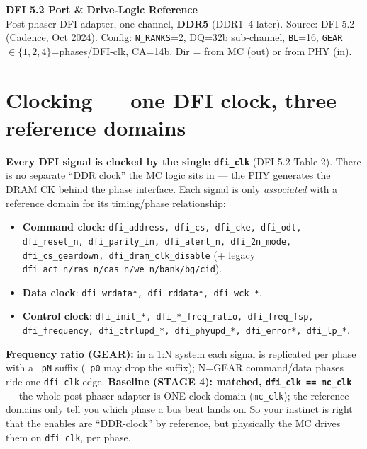 \documentclass[9pt]{extarticle}
\begin{document}
\begin{center}
{\LARGE\textbf{DFI 5.2 Port \& Drive-Logic Reference}}\\[2pt]
{\small Post-phaser DFI adapter, one channel, \textbf{DDR5} (DDR1--4 later). Source: DFI 5.2
(Cadence, Oct 2024). Config: \texttt{N\_RANKS}=2, DQ=32b sub-channel, \texttt{BL}=16,
\texttt{GEAR}$\in\{1,2,4\}$=phases/DFI-clk, CA=14b. Dir = from MC (out) or from PHY (in).}
\end{center}

\section{Clocking --- one DFI clock, three reference domains}
\textbf{Every DFI signal is clocked by the single \texttt{dfi\_clk}} (DFI 5.2 Table 2). There is no
separate ``DDR clock'' the MC logic sits in --- the PHY generates the DRAM CK behind the phase
interface. Each signal is only \emph{associated} with a reference domain for its timing/phase
relationship:
\begin{itemize}\itemsep1pt
\item \textcolor{cmd}{\textbf{Command clock}}: \texttt{dfi\_address, dfi\_cs, dfi\_cke, dfi\_odt,
  dfi\_reset\_n, dfi\_parity\_in, dfi\_alert\_n, dfi\_2n\_mode, dfi\_cs\_geardown,
  dfi\_dram\_clk\_disable} (+ legacy \texttt{dfi\_act\_n/ras\_n/cas\_n/we\_n/bank/bg/cid}).
\item \textcolor{data}{\textbf{Data clock}}: \texttt{dfi\_wrdata*, dfi\_rddata*, dfi\_wck\_*}.
\item \textcolor{ctrl}{\textbf{Control clock}}: \texttt{dfi\_init\_*, dfi\_*\_freq\_ratio,
  dfi\_freq\_fsp, dfi\_frequency, dfi\_ctrlupd\_*, dfi\_phyupd\_*, dfi\_error*, dfi\_lp\_*}.
\end{itemize}
\textbf{Frequency ratio (GEAR):} in a 1:N system each signal is replicated per phase with a
\texttt{\_pN} suffix (\texttt{\_p0} may drop the suffix); N=GEAR command/data phases ride one
\texttt{dfi\_clk} edge. \textbf{Baseline (STAGE 4): matched, \texttt{dfi\_clk == mc\_clk}} --- the
whole post-phaser adapter is ONE clock domain (\texttt{mc\_clk}); the reference domains only tell
you which phase a bus beat lands on. So your instinct is right that the enables are ``DDR-clock''
by reference, but physically the MC drives them on \texttt{dfi\_clk}, per phase.
\end{document}
